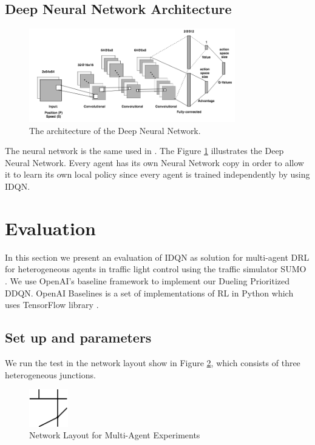 \documentclass{llncs}
\begin{document}
\subsection{Deep Neural Network Architecture}\label{DNNArch}

\begin{figure}[!htbp]
\begin{center}
  \includegraphics[width=0.8\textwidth]{images/CNN.png}
  \caption{The architecture of the Deep Neural Network.}
  \label{fig:CNN}
\end{center}
\end{figure}

The neural network is the same used in \cite{Wang2016}. The Figure \ref{fig:CNN} illustrates the Deep Neural Network. Every agent has its own Neural Network copy in order to allow it to learn its own local policy since every agent is trained independently by using IDQN.

\section{Evaluation}

In this section we present an evaluation of IDQN as solution for multi-agent DRL for heterogeneous agents in traffic light control using the traffic simulator SUMO \cite{SUMO2012}. We use OpenAI's baseline framework \cite{baselines} to implement our Dueling Prioritized DDQN. OpenAI Baselines is a set of implementations of RL in Python which uses TensorFlow library \cite{Abadi2016}. 

\subsection{Set up and parameters}

We run the test in the network layout show in Figure \ref{fig:simSetup}, which consists of three heterogeneous junctions. 

\begin{figure}
\begin{center}
  \includegraphics[width=0.15\textwidth]{images/MARL_env.png}
  \caption{Network Layout for Multi-Agent Experiments}
  \label{fig:simSetup}
\end{center}
\end{figure}
\end{document}
